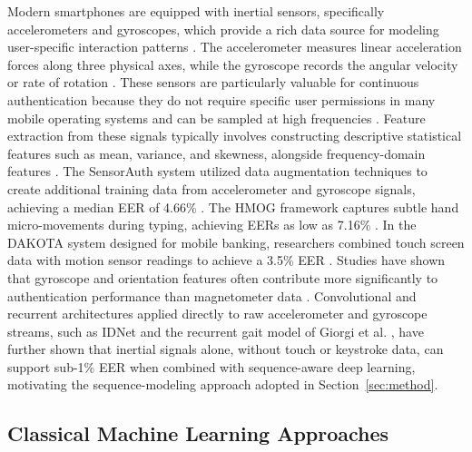 \documentclass[3p,times,procedia]{elsarticle}
\begin{document}
Modern smartphones are equipped with inertial sensors,
specifically accelerometers and gyroscopes, which provide a
rich data source for modeling user-specific interaction
patterns \cite{alzubaidi_authentication_2016}. The accelerometer measures
linear acceleration forces along three physical axes, while
the gyroscope records the angular velocity or rate of rotation
\cite{shen_performance_2018}. These sensors are particularly valuable for
continuous authentication because they do not require specific
user permissions in many mobile operating systems and can be
sampled at high frequencies \cite{abuhamad_autosen_2020}.
Feature extraction from these signals typically involves
constructing descriptive statistical features such as mean,
variance, and skewness, alongside frequency-domain features
\cite{shen_performance_2018}. The SensorAuth system utilized data
augmentation techniques to create additional training data
from accelerometer and gyroscope signals, achieving a median
EER of 4.66\% \cite{li_using_2019}. The HMOG framework captures
subtle hand micro-movements during typing, achieving EERs
as low as 7.16\% \cite{sitova_hmog_2016}. In the DAKOTA system
designed for mobile banking, researchers combined touch screen
data with motion sensor readings to achieve a 3.5\% EER
\cite{incel_dakota_2021}. Studies have shown that gyroscope and
orientation features often contribute more significantly to
authentication performance than magnetometer data \cite{shen_performance_2018}.
Convolutional and recurrent architectures applied directly to
raw accelerometer and gyroscope streams, such as IDNet
\cite{gadaleta_idnet_2018} and the recurrent gait model of
Giorgi et al. \cite{giorgi_using_2021}, have further shown that
inertial signals alone, without touch or keystroke data, can
support sub-1\% EER when combined with sequence-aware deep
learning, motivating the sequence-modeling approach adopted in
Section~\ref{sec:method}.

\subsection{Classical Machine Learning Approaches}
\end{document}
